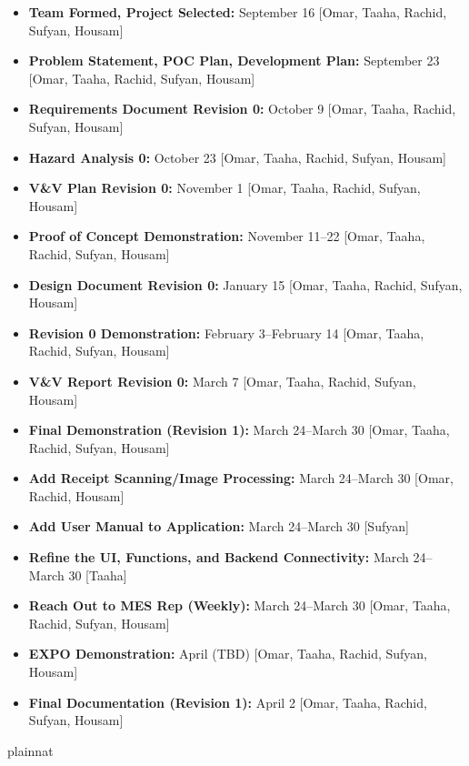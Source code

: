 \documentclass[12pt, titlepage]{article}
\begin{document}
\begin{itemize}
  \item \textbf{Team Formed, Project Selected:} September 16 [Omar, Taaha, Rachid, Sufyan, Housam]
  \item \textbf{Problem Statement, POC Plan, Development Plan:} September 23 [Omar, Taaha, Rachid, Sufyan, Housam]
  \item \textbf{Requirements Document Revision 0:} October 9 [Omar, Taaha, Rachid, Sufyan, Housam]
  \item \textbf{Hazard Analysis 0:} October 23 [Omar, Taaha, Rachid, Sufyan, Housam]
  \item \textbf{V\&V Plan Revision 0:} November 1 [Omar, Taaha, Rachid, Sufyan, Housam]
  \item \textbf{Proof of Concept Demonstration:} November 11--22 [Omar, Taaha, Rachid, Sufyan, Housam]
  \item \textbf{Design Document Revision 0:} January 15 [Omar, Taaha, Rachid, Sufyan, Housam]
  \item \textbf{Revision 0 Demonstration:} February 3--February 14 [Omar, Taaha, Rachid, Sufyan, Housam]
  \item \textbf{V\&V Report Revision 0:} March 7 [Omar, Taaha, Rachid, Sufyan, Housam]
  \item \textbf{Final Demonstration (Revision 1):} March 24--March 30 [Omar, Taaha, Rachid, Sufyan, Housam]
  \item \textbf{Add Receipt Scanning/Image Processing:} March 24--March 30 [Omar, Rachid, Housam]
  \item \textbf{Add User Manual to Application:} March 24--March 30 [Sufyan]
  \item \textbf{Refine the UI, Functions, and Backend Connectivity:} March 24--March 30 [Taaha]
  \item \textbf{Reach Out to MES Rep (Weekly):} March 24--March 30 [Omar, Taaha, Rachid, Sufyan, Housam]
  \item \textbf{EXPO Demonstration:} April (TBD) [Omar, Taaha, Rachid, Sufyan, Housam]
  \item \textbf{Final Documentation (Revision 1):} April 2 [Omar, Taaha, Rachid, Sufyan, Housam]
\end{itemize}

 {plainnat}


\newpage{}
\end{document}
